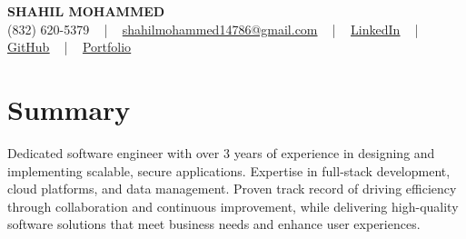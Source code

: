 \documentclass[letterpaper,10pt]{article}
\begin{document}
\begin{center}
    {\fontsize{14pt}{12pt}\selectfont \textbf{\MakeUppercase{Shahil Mohammed}}}\\ \vspace{2pt}
    \fontsize{10pt}{12pt}\selectfont (832) 620-5379 ~ | ~ \href{mailto:shahilmohammed14786@gmail.com}{shahilmohammed14786@gmail.com} ~ | ~  
    \href{https://www.linkedin.com/in/shahil-mohammed-9652931a1/}{\color{blue}\underline{LinkedIn}}  ~ | ~ 
    \href{https://github.com/freakbeast14}{\color{blue}\underline{GitHub}} ~ | ~ 
    \href{https://shahil-mohammed.netlify.app/}{\color{blue}\underline{Portfolio}}
    \vspace{-8pt}
\end{center}

\section{Summary}
\vspace{-2pt}\fontsize{8pt}{9pt}\selectfont
Dedicated software engineer with over 3 years of experience in designing and implementing scalable, secure applications. Expertise in full-stack development, cloud platforms, and data management. Proven track record of driving efficiency through collaboration and continuous improvement, while delivering high-quality software solutions that meet business needs and enhance user experiences.
 \vspace{-5pt}
 
\vspace{-2pt}
\end{document}
